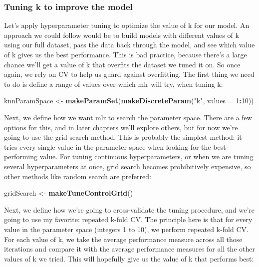 \documentclass[
]{article}
\newenvironment{Shaded}{\begin{snugshade}}{\end{snugshade}}
\newcommand{\AttributeTok}[1]{\textcolor[rgb]{0.13,0.29,0.53}{#1}}
\newcommand{\DecValTok}[1]{\textcolor[rgb]{0.00,0.00,0.81}{#1}}
\newcommand{\FunctionTok}[1]{\textcolor[rgb]{0.13,0.29,0.53}{\textbf{#1}}}
\newcommand{\NormalTok}[1]{#1}
\newcommand{\OtherTok}[1]{\textcolor[rgb]{0.56,0.35,0.01}{#1}}
\newcommand{\SpecialCharTok}[1]{\textcolor[rgb]{0.81,0.36,0.00}{\textbf{#1}}}
\newcommand{\StringTok}[1]{\textcolor[rgb]{0.31,0.60,0.02}{#1}}
\begin{document}
\subsubsection{Tuning k to improve the
model}\label{tuning-k-to-improve-the-model}

Let's apply hyperparameter tuning to optimize the value of k for our
model. An approach we could follow would be to build models with
different values of k using our full dataset, pass the data back through
the model, and see which value of k gives us the best performance. This
is bad practice, because there's a large chance we'll get a value of k
that overfits the dataset we tuned it on. So once again, we rely on CV
to help us guard against overfitting. The first thing we need to do is
define a range of values over which mlr will try, when tuning k:

\begin{Shaded}
\begin{Highlighting}[]
\NormalTok{knnParamSpace }\OtherTok{\textless{}{-}} \FunctionTok{makeParamSet}\NormalTok{(}\FunctionTok{makeDiscreteParam}\NormalTok{(}\StringTok{"k"}\NormalTok{, }\AttributeTok{values =} \DecValTok{1}\SpecialCharTok{:}\DecValTok{10}\NormalTok{))}
\end{Highlighting}
\end{Shaded}

Next, we define how we want mlr to search the parameter space. There are
a few options for this, and in later chapters we'll explore others, but
for now we're going to use the grid search method. This is probably the
simplest method: it tries every single value in the parameter space when
looking for the best-performing value. For tuning continuous
hyperparameters, or when we are tuning several hyperparameters at once,
grid search becomes prohibitively expensive, so other methods like
random search are preferred:

\begin{Shaded}
\begin{Highlighting}[]
\NormalTok{gridSearch }\OtherTok{\textless{}{-}} \FunctionTok{makeTuneControlGrid}\NormalTok{()}
\end{Highlighting}
\end{Shaded}

Next, we define how we're going to cross-validate the tuning procedure,
and we're going to use my favorite: repeated k-fold CV. The principle
here is that for every value in the parameter space (integers 1 to 10),
we perform repeated k-fold CV. For each value of k, we take the average
performance measure across all those iterations and compare it with the
average performance measures for all the other values of k we tried.
This will hopefully give us the value of k that performs best:
\end{document}
